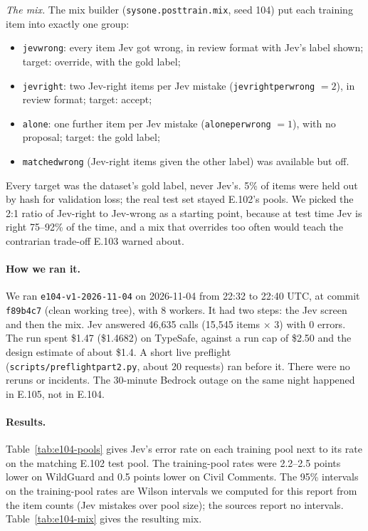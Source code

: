 \documentclass[11pt]{article}
\renewcommand{\_}{\origunderscore\allowbreak}
\begin{document}
\emph{The mix.} The mix builder (\texttt{sysone.posttrain.mix}, seed 104) put each training item into exactly one group:
\begin{itemize}[nosep]
  \item \texttt{jev\_wrong}: every item Jev got wrong, in review format with Jev's label shown; target: override, with the gold label;
  \item \texttt{jev\_right}: two Jev-right items per Jev mistake (\texttt{jev\_right\_per\_wrong} $= 2$), in review format; target: accept;
  \item \texttt{alone}: one further item per Jev mistake (\texttt{alone\_per\_wrong} $= 1$), with no proposal; target: the gold label;
  \item \texttt{matched\_wrong} (Jev-right items given the other label) was available but off.
\end{itemize}
Every target was the dataset's gold label, never Jev's. 5\% of items were held out by hash for validation loss; the real test set stayed E.102's pools. We picked the 2:1 ratio of Jev-right to Jev-wrong as a starting point, because at test time Jev is right 75--92\% of the time, and a mix that overrides too often would teach the contrarian trade-off E.103 warned about.

\paragraph{How we ran it.}
We ran \texttt{e104-v1-2026-11-04} on 2026-11-04 from 22:32 to 22:40 UTC, at commit \texttt{f89b4c7} (clean working tree), with 8 workers. It had two steps: the Jev screen and then the mix. Jev answered 46,635 calls (15,545 items $\times$ 3) with 0 errors. The run spent \$1.47 (\$1.4682) on TypeSafe, against a run cap of \$2.50 and the design estimate of about \$1.4. A short live preflight (\texttt{scripts/preflight\_part2.py}, about 20 requests) ran before it. There were no reruns or incidents. The 30-minute Bedrock outage on the same night happened in E.105, not in E.104.

\paragraph{Results.}
Table~\ref{tab:e104-pools} gives Jev's error rate on each training pool next to its rate on the matching E.102 test pool. The training-pool rates were 2.2--2.5 points lower on WildGuard and 0.5 points lower on Civil Comments. The 95\% intervals on the training-pool rates are Wilson intervals we computed for this report from the item counts (Jev mistakes over pool size); the sources report no intervals. Table~\ref{tab:e104-mix} gives the resulting mix.
\end{document}
